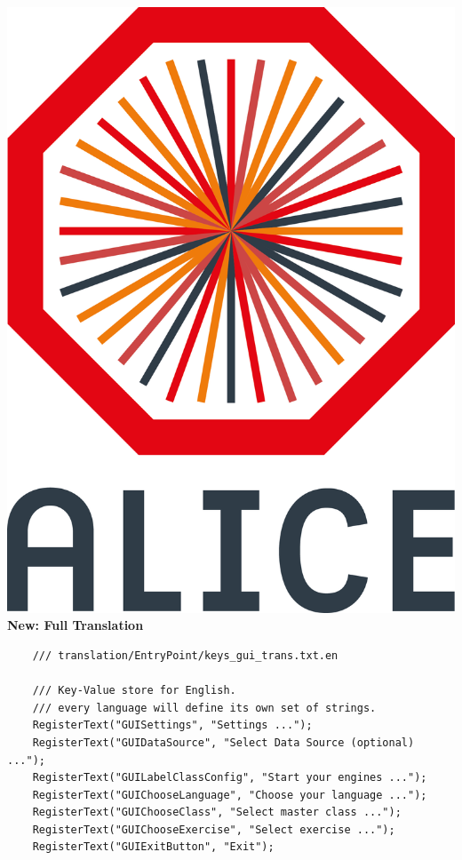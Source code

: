 \documentclass[aspectratio=169,14pt,dvipsnames]{beamer}
\begin{document}
\begin{frame}[fragile]{\includegraphics[height=0.07\textheight]{2012-Jul-04-4_Color_Logo_CB.png} \hspace{0.2cm}\textbf{New: Full Translation}}
  \begin{verbatim}
    /// translation/EntryPoint/keys_gui_trans.txt.en

    /// Key-Value store for English.
    /// every language will define its own set of strings.
    RegisterText("GUISettings", "Settings ...");
    RegisterText("GUIDataSource", "Select Data Source (optional) ...");
    RegisterText("GUILabelClassConfig", "Start your engines ...");
    RegisterText("GUIChooseLanguage", "Choose your language ...");
    RegisterText("GUIChooseClass", "Select master class ...");
    RegisterText("GUIChooseExercise", "Select exercise ...");
    RegisterText("GUIExitButton", "Exit");
  \end{verbatim}
\end{frame}
\end{document}
